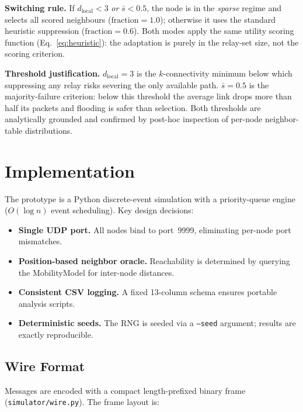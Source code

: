 \documentclass[conference]{IEEEtran}
\begin{document}
\textbf{Switching rule.}  If $d_{\text{local}} < 3$ \emph{or}
$\bar{s} < 0.5$, the node is in the \emph{sparse} regime and selects all
scored neighbours ($\text{fraction}=1.0$); otherwise it uses the standard
heuristic suppression ($\text{fraction}=0.6$).  Both modes apply the same
utility scoring function (Eq.~\ref{eq:heuristic}): the adaptation is purely in
the relay-set size, not the scoring criterion.

\textbf{Threshold justification.}  $d_{\text{local}} = 3$ is the
$k$-connectivity minimum below which suppressing any relay risks severing the
only available path.  $\bar{s} = 0.5$ is the majority-failure criterion: below
this threshold the average link drops more than half its packets and flooding is
safer than selection.  Both thresholds are analytically grounded and confirmed
by post-hoc inspection of per-node neighbor-table distributions.

\section{Implementation}
\label{sec:impl}

The prototype is a Python discrete-event simulation with a priority-queue
engine ($O(\log n)$ event scheduling).  Key design decisions:

\begin{itemize}
  \item \textbf{Single UDP port.}  All nodes bind to port~9999, eliminating
        per-node port mismatches.
  \item \textbf{Position-based neighbor oracle.}  Reachability is determined by
        querying the MobilityModel for inter-node distances.
  \item \textbf{Consistent CSV logging.}  A fixed 13-column schema ensures
        portable analysis scripts.
  \item \textbf{Deterministic seeds.}  The RNG is seeded via a \texttt{--seed}
        argument; results are exactly reproducible.
\end{itemize}

\subsection{Wire Format}
\label{ssec:wire}

Messages are encoded with a compact length-prefixed binary frame (\texttt{simulator/wire.py}).
The frame layout is:
\end{document}
